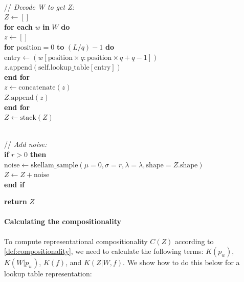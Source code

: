 \documentclass{article}
\newcommand{\comp}{representational compositionality}
\begin{document}
\begin{appendices}
\begin{algorithm}
\begin{algorithmic}
\item 
\\ // \textit{Decode W to get Z:}
\\ $Z \leftarrow []$
\\ \textbf{for each} $w$ \textbf{in} $W$ \textbf{do}
\\ \hspace{1em} $z \leftarrow []$
\\ \hspace{1em} \textbf{for} $\text{position} = 0$ \textbf{to} $(L / q) - 1$ \textbf{do}
\\ \hspace{2em} $\text{entry} \leftarrow (w[\text{position} \times q:\text{position} \times q + q - 1])$
\\ \hspace{2em} $z.\text{append}(\text{self.lookup\_table}[\text{entry}])$
\\ \hspace{1em} \textbf{end for}
\\ \hspace{1em} $z \leftarrow \text{concatenate}(z)$ 
\\ \hspace{1em} $Z.\text{append}(z)$
\\ \textbf{end for}
\\ $Z \leftarrow \text{stack}(Z)$

\item 
\\ // \textit{Add noise:}
\\ \textbf{if} $r > 0$ \textbf{then}
\\ \hspace{1em} $\text{noise} \leftarrow \text{skellam\_sample}(\mu=0, \sigma=r, \lambda=\lambda, \text{shape}=Z.\text{shape})$
\\ \hspace{1em} $Z \leftarrow Z + \text{noise}$
\\ \textbf{end if}

\item \textbf{return} $Z$
\end{algorithmic}
\end{algorithm}

\paragraph{Calculating the compositionality}

To compute \comp{} $C(Z)$ according to \cref{def:compositionality}, we need to calculate the following terms: $K(p_w)$, $K(W|p_w)$, $K(f)$, and  $K(Z|W,f)$. We show how to do this below for a lookup table representation:


\end{appendices}
\end{document}
